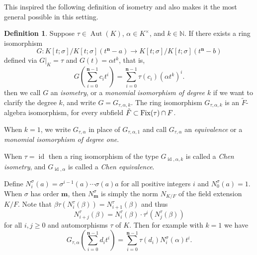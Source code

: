\documentclass[11pt]{amsart}
\theoremstyle{plain}
\theoremstyle{definition}
\newtheorem{definition}[theorem]{Definition}
\numberwithin{equation}{section}
\numberwithin{figure}{section}
\DeclareMathOperator{\id}{id}
\newcommand{\os}{{\mathbf{m}}}  %
\newcommand{\de}{{\mathbf{n}}}  %
\DeclareMathOperator{\Aut}{Aut}
\begin{document}
This inspired the following definition of isometry and also makes it the most general possible in this setting.

\begin{definition}\label{D:Gtaualpha}
      Suppose $\tau\in \Aut(K)$, $\alpha \in K^\times$, and $k\in \mathbb{N}$.
    If there exists a  ring isomorphism
    $$
    G: K[t;\sigma]/K[t;\sigma](t^\de-a) \to K[t;\sigma]/K[t;\sigma](t^\de-b)
    $$
    defined via $G|_{K}=\tau$ and $G(t)=\alpha t^k$,
    that is,
\begin{equation}\label{E:formulaG(t)2}
G \left( \sum_{i=0}^{\de-1}c_it^i \right) = \sum_{i=0}^{\de-1}\tau(c_i) (\alpha t^k)^i.
\end{equation}
     then we call $G$ an \emph{isometry}, or a \emph{monomial isomorphism  of degree $k$} if we want to clarify the degree $k$, and write $G=G_{\tau,\alpha,k}$.
      The ring isomorphism $G_{\tau,\alpha,k}$%
  is an $\tilde{F}$-algebra isomorphism, for every subfield $\tilde{F}\subset {\rm Fix}(\tau)\cap F$.
\end{definition}

      When $k=1$, we write $G_{\tau,\alpha}$ in place of $G_{\tau,\alpha,1}$ and call $G_{\tau,\alpha}$ an \emph{equivalence}  or a \emph{monomial isomorphism  of degree one}.

When $\tau=\id$ then a ring isomorphism of the type
    $G_{\id,\alpha,k}$ %
    is called a  \emph{Chen isometry}, and $G_{\id,\alpha}$ is called a \emph{Chen equivalence}.


Define $N_i^\sigma(a)=\sigma^{i-1}(a)\cdots \sigma(a)a$ for all positive integers $i$ and $N_0^\sigma(a)=1$. When $\sigma$ has order $\os$, then  $N_{\os}^\sigma$ is simply the norm  $N_{K/F}$ of the field extension $K/F$.
Note that $\beta \tau(N_i^\tau(\beta))=N_{i+1}^\tau(\beta)$ and thus
\begin{equation}\label{E:Normrelation}
N_{i+j}^\tau(\beta)= N_{i}^\tau(\beta) \cdot \tau^{i}(N_j^\tau(\beta))
\end{equation}
for all $i,j\geq 0$ and automorphisms $\tau$ of $K$.
Then for example with $k=1$ we have
$$G_{\tau,\alpha}(\sum_{i=0}^{\de-1}d_it^i)=\sum_{i=0}^{\de-1}\tau(d_i) N^\sigma_{i}(\alpha) t^i.$$



\end{document}

